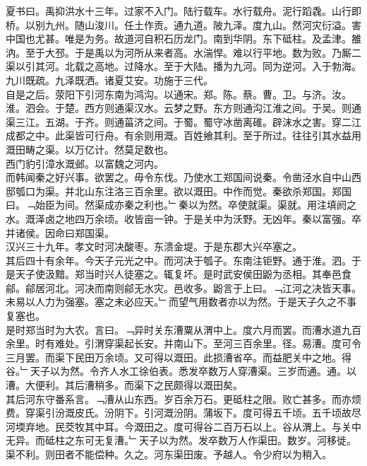 \documentclass{zhvt-classic}
\begin{document}
\hspace*{2em}夏书曰。禹抑洪水十三年。过家不入门。陆行载车。水行载舟。泥行蹈毳。山行即桥。以别九州。随山浚川。任土作贡。通九道。陂九泽。度九山。然河灾衍溢。害中国也尤甚。唯是为务。故道河自积石历龙门。南到华阴。东下砥柱。及孟津。雒汭。至于大邳。于是禹以为河所从来者高。水湍悍。难以行平地。数为败。乃厮二渠以引其河。北载之高地。过降水。至于大陆。播为九河。同为逆河。入于勃海。九川既疏。九泽既洒。诸夏艾安。功施于三代。\\
\hspace*{2em}自是之后。荥阳下引河东南为鸿沟。以通宋。郑。陈。蔡。曹。卫。与济。汝。淮。泗会。于楚。西方则通渠汉水。云梦之野。东方则通沟江淮之间。于吴。则通渠三江。五湖。于齐。则通菑济之间。于蜀。蜀守冰凿离碓。辟沫水之害。穿二江成都之中。此渠皆可行舟。有余则用溉。百姓飨其利。至于所过。往往引其水益用溉田畴之渠。以万亿计。然莫足数也。\\
\hspace*{2em}西门豹引漳水溉邺。以富魏之河内。\\
\hspace*{2em}而韩闻秦之好兴事。欲罢之。毋令东伐。乃使水工郑国间说秦。令凿泾水自中山西邸瓠口为渠。并北山东注洛三百余里。欲以溉田。中作而觉。秦欲杀郑国。郑国曰。﹁始臣为间。然渠成亦秦之利也。﹂秦以为然。卒使就渠。渠就。用注填阏之水。溉泽卤之地四万余顷。收皆亩一钟。于是关中为沃野。无凶年。秦以富强。卒并诸侯。因命曰郑国渠。\\
\hspace*{2em}汉兴三十九年。孝文时河决酸枣。东溃金堤。于是东郡大兴卒塞之。\\
\hspace*{2em}其后四十有余年。今天子元光之中。而河决于瓠子。东南注钜野。通于淮。泗。于是天子使汲黯。郑当时兴人徒塞之。辄复坏。是时武安侯田鼢为丞相。其奉邑食鄃。鄃居河北。河决而南则鄃无水灾。邑收多。鼢言于上曰。﹁江河之决皆天事。未易以人力为强塞。塞之未必应天。﹂而望气用数者亦以为然。于是天子久之不事复塞也。\\
\hspace*{2em}是时郑当时为大农。言曰。﹁异时关东漕粟从渭中上。度六月而罢。而漕水道九百余里。时有难处。引渭穿渠起长安。并南山下。至河三百余里。径。易漕。度可令三月罢。而渠下民田万余顷。又可得以溉田。此损漕省卒。而益肥关中之地。得谷。﹂天子以为然。令齐人水工徐伯表。悉发卒数万人穿漕渠。三岁而通。通。以漕。大便利。其后漕稍多。而渠下之民颇得以溉田矣。\\
\hspace*{2em}其后河东守番系言。﹁漕从山东西。岁百余万石。更砥柱之限。败亡甚多。而亦烦费。穿渠引汾溉皮氏。汾阴下。引河溉汾阴。蒲坂下。度可得五千顷。五千顷故尽河堧弃地。民茭牧其中耳。今溉田之。度可得谷二百万石以上。谷从渭上。与关中无异。而砥柱之东可无复漕。﹂天子以为然。发卒数万人作渠田。数岁。河移徙。渠不利。则田者不能偿种。久之。河东渠田废。予越人。令少府以为稍入。\\
\end{document}
